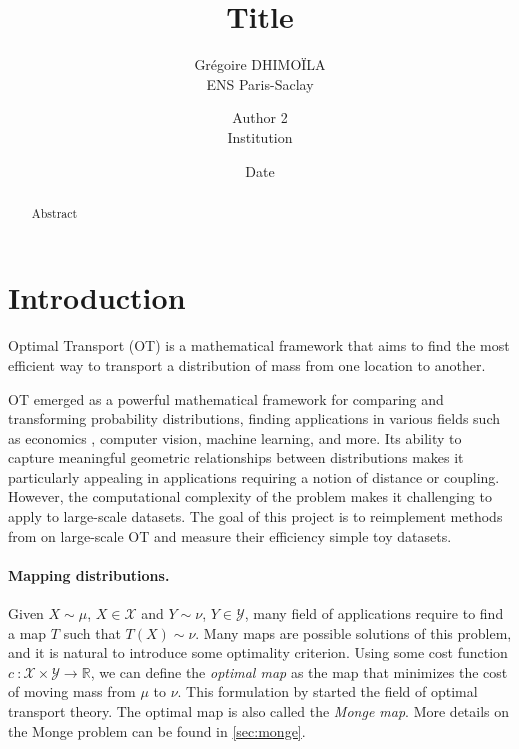 \documentclass[a4paper,11pt]{article}
\newcommand{\R}{\mathbb{R}}
\newcommand{\1}{\mathbbm{1}}
\begin{document}
\title{Title}
\author{
    Grégoire DHIMOÏLA \\
    ENS Paris-Saclay
    \and
    Author 2 \\ Institution
}
\date{Date}
\maketitle

\begin{abstract}
    Abstract
\end{abstract}

\section{Introduction}
\label{sec:introduction}

\paragraph{}Optimal Transport (OT) is a mathematical framework that aims to find the most efficient way to transport a distribution of mass from one location to another.

OT emerged as a powerful mathematical framework for comparing and transforming probability distributions, finding applications in various fields such as economics \citet{galichon2018optimal}, computer vision\citet{bonneel2023survey}, machine learning\citet{montesuma2024recent}, and more. Its ability to capture meaningful geometric relationships between distributions makes it particularly appealing in applications requiring a notion of distance or coupling. However, the computational complexity of the problem makes it challenging to apply to large-scale datasets. The goal of this project is to reimplement methods from \citet{seguy2018largescaleoptimaltransportmapping} on large-scale OT and measure their efficiency simple toy datasets.

\paragraph{Mapping distributions.}Given $X \sim \mu$, $X \in \mathcal{X}$ and $Y \sim \nu$, $Y \in \mathcal{Y}$, many field of applications require to find a map $T$ such that $T(X) \sim \nu$. Many maps are possible solutions of this problem, and it is natural to introduce some optimality criterion. Using some cost function $c~: \mathcal{X} \times \mathcal{Y} \rightarrow \R$, we can define the \emph{optimal map} as the map that minimizes the cost of moving mass from $\mu$ to $\nu$. This formulation by \citet{monge1781memoire} started the field of optimal transport theory. The optimal map is also called the \emph{Monge map}. More details on the Monge problem can be found in \cref{sec:monge}.
\end{document}
